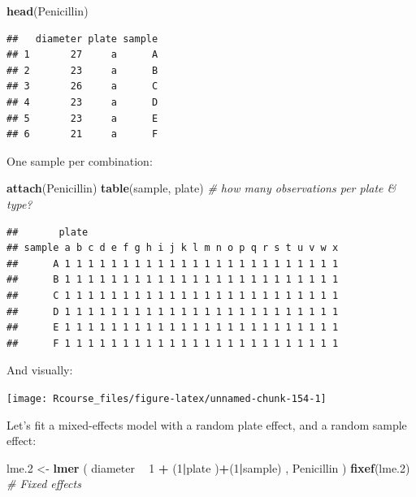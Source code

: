 \documentclass[]{book}
\newenvironment{Shaded}{\begin{snugshade}}{\end{snugshade}}
\newcommand{\KeywordTok}[1]{\textcolor[rgb]{0.13,0.29,0.53}{\textbf{#1}}}
\newcommand{\DecValTok}[1]{\textcolor[rgb]{0.00,0.00,0.81}{#1}}
\newcommand{\StringTok}[1]{\textcolor[rgb]{0.31,0.60,0.02}{#1}}
\newcommand{\CommentTok}[1]{\textcolor[rgb]{0.56,0.35,0.01}{\textit{#1}}}
\newcommand{\OperatorTok}[1]{\textcolor[rgb]{0.81,0.36,0.00}{\textbf{#1}}}
\newcommand{\NormalTok}[1]{#1}
\theoremstyle{definition}
\theoremstyle{definition}
\theoremstyle{definition}
\theoremstyle{remark}
\begin{document}
\begin{Shaded}
\begin{Highlighting}[]
\KeywordTok{head}\NormalTok{(Penicillin)}
\end{Highlighting}
\end{Shaded}

\begin{verbatim}
##   diameter plate sample
## 1       27     a      A
## 2       23     a      B
## 3       26     a      C
## 4       23     a      D
## 5       23     a      E
## 6       21     a      F
\end{verbatim}

One sample per combination:

\begin{Shaded}
\begin{Highlighting}[]
\KeywordTok{attach}\NormalTok{(Penicillin)}
\KeywordTok{table}\NormalTok{(sample, plate) }\CommentTok{# how many observations per plate & type?}
\end{Highlighting}
\end{Shaded}

\begin{verbatim}
##       plate
## sample a b c d e f g h i j k l m n o p q r s t u v w x
##      A 1 1 1 1 1 1 1 1 1 1 1 1 1 1 1 1 1 1 1 1 1 1 1 1
##      B 1 1 1 1 1 1 1 1 1 1 1 1 1 1 1 1 1 1 1 1 1 1 1 1
##      C 1 1 1 1 1 1 1 1 1 1 1 1 1 1 1 1 1 1 1 1 1 1 1 1
##      D 1 1 1 1 1 1 1 1 1 1 1 1 1 1 1 1 1 1 1 1 1 1 1 1
##      E 1 1 1 1 1 1 1 1 1 1 1 1 1 1 1 1 1 1 1 1 1 1 1 1
##      F 1 1 1 1 1 1 1 1 1 1 1 1 1 1 1 1 1 1 1 1 1 1 1 1
\end{verbatim}

And visually:

\texttt{[image: Rcourse\_files/figure-latex/unnamed-chunk-154-1]}

Let's fit a mixed-effects model with a random plate effect, and a random
sample effect:

\begin{Shaded}
\begin{Highlighting}[]
\NormalTok{lme.}\DecValTok{2}\NormalTok{ <-}\StringTok{ }\KeywordTok{lmer}\NormalTok{ ( diameter }\OperatorTok{~}\StringTok{  }\DecValTok{1}  \OperatorTok{+}\StringTok{ }\NormalTok{(}\DecValTok{1}\OperatorTok{|}\NormalTok{plate )}\OperatorTok{+}\NormalTok{(}\DecValTok{1}\OperatorTok{|}\NormalTok{sample) , Penicillin )}
\KeywordTok{fixef}\NormalTok{(lme.}\DecValTok{2}\NormalTok{) }\CommentTok{# Fixed effects}
\end{Highlighting}
\end{Shaded}
\end{document}
